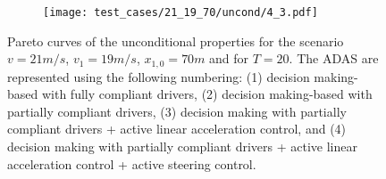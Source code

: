\begin{figure}[H]
\begin{subfigure}{0.32\textwidth}
\end{subfigure}
\begin{subfigure}{0.32\textwidth}
  \centering
  \texttt{[image: test\_cases/21\_19\_70/uncond/4\_3.pdf]}
\end{subfigure}
\caption{Pareto curves of the unconditional properties for the scenario $v = 21m/s$, $v_1 = 19m/s$, $x_{1,0} = 70m$ and for $T = 20$. The ADAS are represented using the following numbering: (1) decision making-based with fully compliant drivers, (2) decision making-based with partially compliant drivers, (3) decision making with partially compliant drivers + active linear acceleration control, and (4) decision making with partially compliant drivers + active linear acceleration control + active steering control.}
\label{fig:test_case_1_uncond}
\end{figure}


